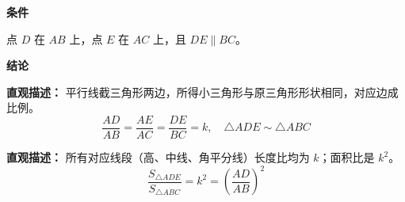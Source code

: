 \begin{statementbox}

	\textbf{\textcolor{CStatement}{条件}}
	\begin{description}[style=nextline, leftmargin=2.8em, labelsep=0.5em, itemsep=0.35em]
		\item[\textbf{\textcolor{CStatement}{条件1（平行截取点）：}}] 点 $D$ 在 $AB$ 上，点 $E$ 在 $AC$ 上，且 $DE\parallel BC$。
	\end{description}

	\textbf{\textcolor{CStatement}{结论}}
	\begin{description}[style=nextline, leftmargin=2.8em, labelsep=0.5em, itemsep=0.45em]
		\item[\textbf{\textcolor{CStatement}{结论一（相似三角形）：}}]
			\textbf{\textcolor{CStatement}{直观描述：}}
			平行线截三角形两边，所得小三角形与原三角形形状相同，对应边成比例。
			\[
				\frac{AD}{AB} = \frac{AE}{AC} = \frac{DE}{BC} = k,\quad \triangle ADE\sim\triangle ABC
			\]

		\item[\textbf{\textcolor{CStatement}{推广结论（面积与线段比）：}}]
			\textbf{\textcolor{CStatement}{直观描述：}}
			所有对应线段（高、中线、角平分线）长度比均为 $k$；面积比是 $k^2$。
			\[
				\frac{S_{\triangle ADE}}{S_{\triangle ABC}} = k^2 = \left(\frac{AD}{AB}\right)^2
			\]
	\end{description}

\end{statementbox}
